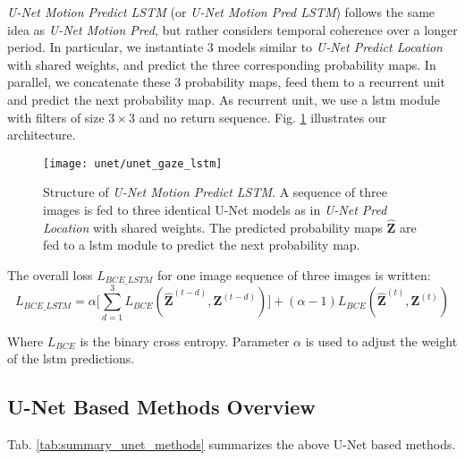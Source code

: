 \textit{U-Net Motion Predict LSTM} (or \textit{U-Net Motion Pred LSTM}) follows the same idea as \textit{U-Net Motion Pred}, but rather considers temporal coherence over a longer period.
In particular, we instantiate $3$ models similar to \textit{U-Net Predict Location} with shared weights, and predict the three corresponding probability maps.
In parallel, we concatenate these $3$ probability maps, feed them to a recurrent unit and predict the next probability map.
As recurrent unit, we use a \gls{lstm} module \cite{shi15} with filters of size $3 \times 3$ and no return sequence.
Fig. \ref{fig:unet_gaze_lstm} illustrates our architecture.

\endgroup

\begin{figure}[htbp]
  \centering
  \texttt{[image: unet/unet\_gaze\_lstm]}
  \caption[Structure of U-Net Motion Predict LSTM]{Structure of \textit{U-Net Motion Predict LSTM}.
    A sequence of three images is fed to three identical U-Net models as in \textit{U-Net Pred Location} with shared weights.
    The predicted probability maps $\boldsymbol{\hat{Z}}$ are fed to a \gls{lstm} module to predict the next probability map.}
  \label{fig:unet_gaze_lstm}
\end{figure}

The overall loss $L_{BCE\_LSTM}$ for one image sequence of three images is written:
\begin{equation}
L_{BCE\_LSTM} = \alpha \Big[\sum_{d=1}^3 L_{BCE}(\boldsymbol{\hat{Z}}^{(t-d)}, \boldsymbol{Z}^{(t-d)})\Big] + (\alpha - 1) L_{BCE}(\boldsymbol{\hat{Z}}^{(t)}, \boldsymbol{Z}^{(t)})
\label{eq:bce_lstm}
\end{equation}

Where $L_{BCE}$ is the binary cross entropy.
Parameter $\alpha$ is used to adjust the weight of the \gls{lstm} predictions.

\subsection{U-Net Based Methods Overview}
Tab. \ref{tab:summary_unet_methods} summarizes the above U-Net based methods.

